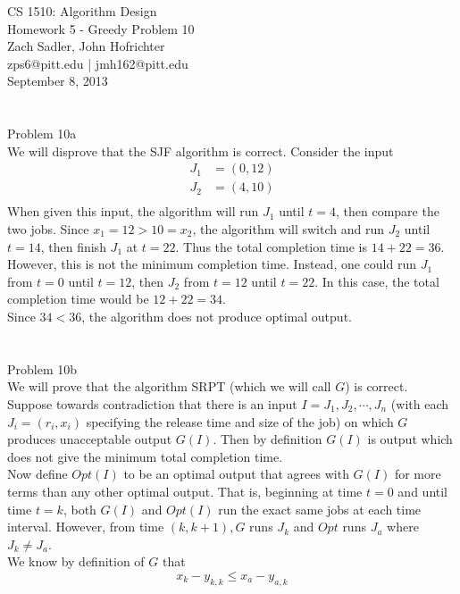 \documentclass[11pt]{article}
\begin{document}
\noindent 
CS 1510: Algorithm Design\\
Homework 5 - Greedy Problem 10\\
Zach Sadler, John Hofrichter\\
zps6@pitt.edu | jmh162@pitt.edu\\
September 8, 2013\\ 
\\ 
\\

\noindent \huge 
Problem 10a\\
\normalsize
\noindent 
We will disprove that the SJF algorithm is correct. Consider the input
\begin{align*}
	J_1 & = (0, 12)\\
    	J_2 & = (4, 10)\\
\end{align*}
When given this input, the algorithm will run $J_1$ until $t = 4$, then compare the two jobs. Since $x_1 = 12 > 10 = x_2$, the algorithm will switch and run $J_2$ until $t = 14$, then finish $J_1$ at $t = 22$. Thus the total completion time is $14 + 22 = 36$.\\
However, this is not the minimum completion time. Instead, one could run $J_1$ from $t = 0$ until $t = 12$, then $J_2$ from $t = 12$ until $t = 22$. In this case, the total completion time would be $12 + 22 = 34$.\\
Since $34 < 36$, the algorithm does not produce optimal output.\\
\\
\\
\noindent \huge 
Problem 10b\\
\normalsize
\noindent
We will prove that the algorithm SRPT (which we will call $G$) is correct.\\
Suppose towards contradiction that there is an input $I = J_1, J_2, \cdots, J_n$ (with each $J_i = (r_i, x_i)$ specifying the release time and size of the job) on which $G$ produces unacceptable output $G(I)$. Then by definition $G(I)$ is output which does not give the minimum total completion time.\\
Now define $Opt(I)$ to be an optimal output that agrees with $G(I)$ for more terms than any other optimal output. That is, beginning at time $t = 0$ and until time $t = k$, both $G(I)$ and $Opt(I)$ run the exact same jobs at each time interval. However, from time $(k, k+1), G$ runs $J_k$ and $Opt$ runs $J_a$ where $J_k \ne J_a$.\\
We know by definition of $G$ that
\[
x_k - y_{k, k} \le x_a - y_{a, k} 
\]
\end{document}
